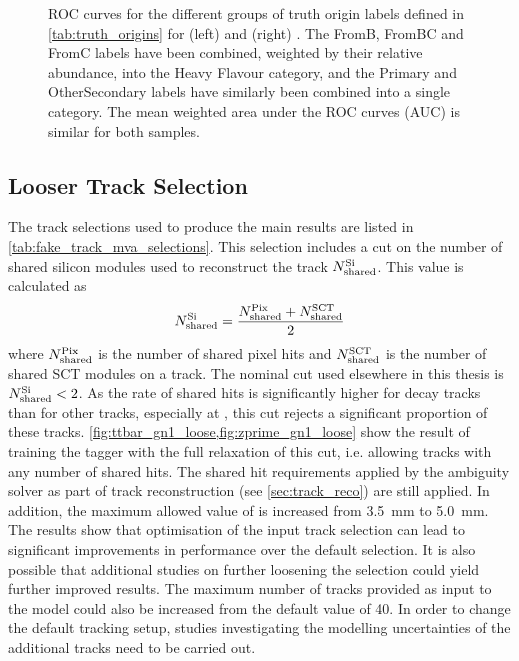 \begin{figure}[!htbp]
\begin{subfigure}[b]{0.48\textwidth}
    \end{subfigure}
    \caption{
        ROC curves for the different groups of truth origin labels defined in \cref{tab:truth_origins} for \ttbarjets (left) and \Zprimejets (right) \cite{ATL-PHYS-PUB-2022-027}.
        The FromB, FromBC and FromC labels have been combined, weighted by their relative abundance, into the Heavy Flavour category, and the Primary and OtherSecondary labels have similarly been combined into a single category.
        The mean weighted area under the ROC curves (AUC) is similar for both samples.}
    \label{fig:track_origin_roc}
\end{figure}



\subsection{Looser Track Selection}\label{sec:looser_track_selection}

The track selections used to produce the main results are listed in \cref{tab:fake_track_mva_selections}.
This selection includes a cut on the number of shared silicon modules used to reconstruct the track $N^{\textnormal{Si}}_{\textnormal{shared}}$.
This value is calculated as 
%
\begin{equation}
    N^{\textnormal{Si}}_{\textnormal{shared}} = 
    \frac{N^{\textnormal{Pix}}_{\textnormal{shared}} + N^{\textnormal{SCT}}_{\textnormal{shared}}}{2}
\end{equation}
%
where $N^{\textnormal{Pix}}_{\textnormal{shared}}$ is the number of shared pixel hits and $N^{\textnormal{SCT}}_{\textnormal{shared}}$ is the number of shared SCT modules on a track.
The nominal cut used elsewhere in this thesis is $N^{\textnormal{Si}}_{\textnormal{shared}} < 2$.
As the rate of shared hits is significantly higher for \bhadron decay tracks than for other tracks, especially at \highpt, this cut rejects a significant proportion of these tracks.
\cref{fig:ttbar_gn1_loose,fig:zprime_gn1_loose} show the result of training the \GNN tagger with the full relaxation of this cut, i.e. allowing tracks with any number of shared hits.
The shared hit requirements applied by the ambiguity solver as part of track reconstruction (see \cref{sec:track_reco}) are still applied.
In addition, the maximum allowed value of \dzero is increased from \SI{3.5}{\milli\meter} to \SI{5.0}{\milli\meter}.
The results show that optimisation of the input track selection can lead to significant improvements in performance over the default selection.
It is also possible that additional studies on further loosening the selection could yield further improved results.
The maximum number of tracks provided as input to the model could also be increased from the default value of 40.
In order to change the default tracking setup, studies investigating the modelling uncertainties of the additional tracks need to be carried out.


